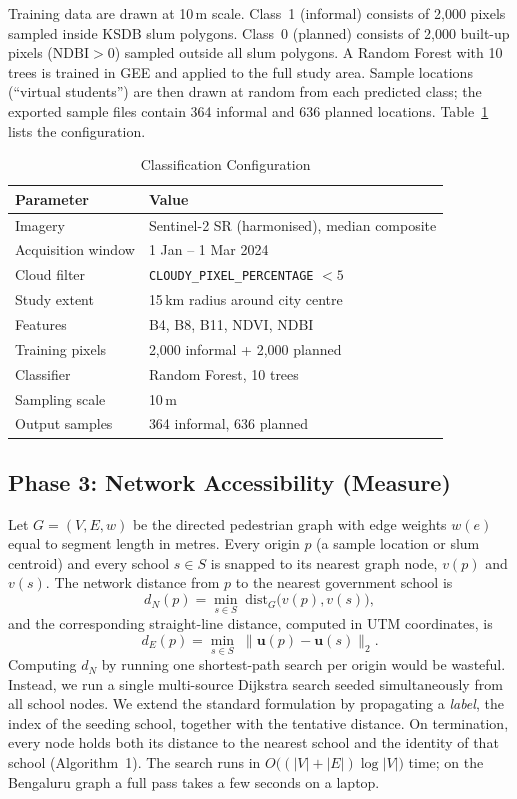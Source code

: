 \documentclass[conference]{IEEEtran}
\newcommand{\km}{\,km}
\newcommand{\m}{\,m}
\begin{document}
Training data are drawn at 10\m{} scale. Class~1 (informal) consists of 2,000 pixels sampled inside KSDB slum polygons. Class~0 (planned) consists of 2,000 built-up pixels ($\mathrm{NDBI}>0$) sampled outside all slum polygons. A Random Forest \cite{breiman2001} with 10 trees is trained in GEE and applied to the full study area. Sample locations (``virtual students'') are then drawn at random from each predicted class; the exported sample files contain 364 informal and 636 planned locations. Table~\ref{tab:rf} lists the configuration.

\begin{table}[!t]
\centering
\caption{Classification Configuration}
\label{tab:rf}
\footnotesize
\begin{tabular}{@{}ll@{}}
\toprule
\textbf{Parameter} & \textbf{Value} \\
\midrule
Imagery & Sentinel-2 SR (harmonised), median composite \\
Acquisition window & 1 Jan -- 1 Mar 2024 \\
Cloud filter & \texttt{CLOUDY\_PIXEL\_PERCENTAGE} $<5$ \\
Study extent & 15\km{} radius around city centre \\
Features & B4, B8, B11, NDVI, NDBI \\
Training pixels & 2,000 informal + 2,000 planned \\
Classifier & Random Forest, 10 trees \\
Sampling scale & 10\m{} \\
Output samples & 364 informal, 636 planned \\
\bottomrule
\end{tabular}
\end{table}

\subsection{Phase 3: Network Accessibility (Measure)}
Let $G=(V,E,w)$ be the directed pedestrian graph with edge weights $w(e)$ equal to segment length in metres. Every origin $p$ (a sample location or slum centroid) and every school $s\in S$ is snapped to its nearest graph node, $v(p)$ and $v(s)$. The network distance from $p$ to the nearest government school is
\begin{equation}
d_N(p)=\min_{s\in S}\; \mathrm{dist}_G\big(v(p),v(s)\big),
\end{equation}
and the corresponding straight-line distance, computed in UTM coordinates, is
\begin{equation}
d_E(p)=\min_{s\in S}\; \lVert \mathbf{u}(p)-\mathbf{u}(s)\rVert_2 .
\end{equation}
Computing $d_N$ by running one shortest-path search per origin would be wasteful. Instead, we run a single multi-source Dijkstra search \cite{dijkstra1959} seeded simultaneously from all school nodes. We extend the standard formulation by propagating a \emph{label}, the index of the seeding school, together with the tentative distance. On termination, every node holds both its distance to the nearest school and the identity of that school (Algorithm~1). The search runs in $O\big((|V|+|E|)\log|V|\big)$ time; on the Bengaluru graph a full pass takes a few seconds on a laptop.
\end{document}
